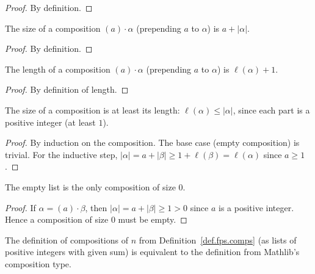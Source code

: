 \begin{proof}
\leanok
By definition.
\end{proof}

\begin{lemma}
\label{lem.fps.comps.size-cons}
\leanhelper
\leanok
The size of a composition $(a) \cdot \alpha$ (prepending $a$ to $\alpha$)
is $a + |\alpha|$.
\end{lemma}

\begin{proof}
\leanok
By definition.
\end{proof}

\begin{lemma}
\label{lem.fps.comps.len-cons}
\leanhelper
\leanok
The length of a composition $(a) \cdot \alpha$ (prepending $a$ to $\alpha$)
is $\ell(\alpha) + 1$.
\end{lemma}

\begin{proof}
\leanok
By definition of length.
\end{proof}

\begin{lemma}
\label{lem.fps.comps.size-ge-len}
\leanhelper
\leanok
The size of a composition is at least its length: $\ell(\alpha) \leq |\alpha|$,
since each part is a positive integer (at least $1$).
\end{lemma}

\begin{proof}
\leanok
By induction on the composition. The base case (empty composition) is trivial.
For the inductive step, $|\alpha| = a + |\beta| \geq 1 + \ell(\beta) = \ell(\alpha)$
since $a \geq 1$.
\end{proof}

\begin{lemma}
\label{lem.fps.comps.empty-of-size-zero}
\leanhelper
\leanok
The empty list is the only composition of size $0$.
\end{lemma}

\begin{proof}
\leanok
If $\alpha = (a) \cdot \beta$, then $|\alpha| = a + |\beta| \geq 1 > 0$
since $a$ is a positive integer. Hence a composition of size $0$ must be empty.
\end{proof}

\begin{lemma}
\label{lem.fps.comps.equiv-mathlib}
\leanhelper
\leanok
The definition of compositions of $n$ from Definition~\ref{def.fps.comps}
(as lists of positive integers with given sum) is equivalent to the definition
from Mathlib's composition type.
\end{lemma}

